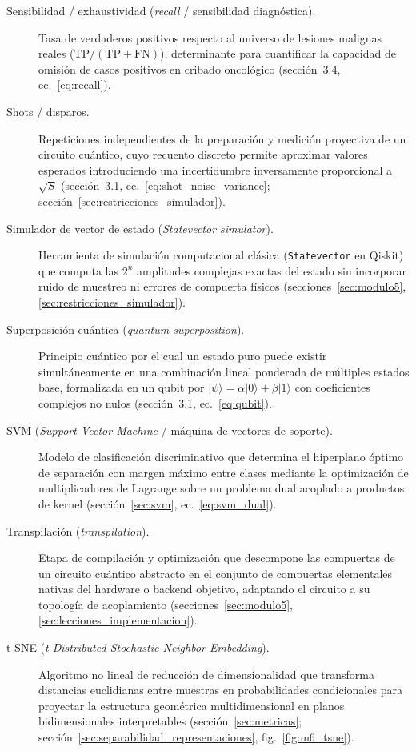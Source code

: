 \begin{description}
  \item[Sensibilidad / exhaustividad (\textit{recall} / sensibilidad diagnóstica).] Tasa de verdaderos positivos respecto al universo de lesiones malignas reales ($\mathrm{TP} / (\mathrm{TP} + \mathrm{FN})$), determinante para cuantificar la capacidad de omisión de casos positivos en cribado oncológico (sección~3.4, ec.~\ref{eq:recall}).

  \item[Shots / disparos.] Repeticiones independientes de la preparación y medición proyectiva de un circuito cuántico, cuyo recuento discreto permite aproximar valores esperados introduciendo una incertidumbre inversamente proporcional a $\sqrt{S}$ (sección~3.1, ec.~\ref{eq:shot_noise_variance}; sección~\ref{sec:restricciones_simulador}).

  \item[Simulador de vector de estado (\textit{Statevector simulator}).] Herramienta de simulación computacional clásica (\texttt{Statevector} en Qiskit) que computa las $2^n$ amplitudes complejas exactas del estado sin incorporar ruido de muestreo ni errores de compuerta físicos (secciones~\ref{sec:modulo5}, \ref{sec:restricciones_simulador}).

  \item[Superposición cuántica (\textit{quantum superposition}).] Principio cuántico por el cual un estado puro puede existir simultáneamente en una combinación lineal ponderada de múltiples estados base, formalizada en un qubit por $|\psi\rangle = \alpha|0\rangle + \beta|1\rangle$ con coeficientes complejos no nulos (sección~3.1, ec.~\ref{eq:qubit}).

  \item[SVM (\textit{Support Vector Machine} / máquina de vectores de soporte).] Modelo de clasificación discriminativo que determina el hiperplano óptimo de separación con margen máximo entre clases mediante la optimización de multiplicadores de Lagrange sobre un problema dual acoplado a productos de kernel (sección~\ref{sec:svm}, ec.~\ref{eq:svm_dual}).


  \item[Transpilación (\textit{transpilation}).] Etapa de compilación y optimización que descompone las compuertas de un circuito cuántico abstracto en el conjunto de compuertas elementales nativas del hardware o backend objetivo, adaptando el circuito a su topología de acoplamiento (secciones~\ref{sec:modulo5}, \ref{sec:lecciones_implementacion}).

  \item[t-SNE (\textit{t-Distributed Stochastic Neighbor Embedding}).] Algoritmo no lineal de reducción de dimensionalidad que transforma distancias euclidianas entre muestras en probabilidades condicionales para proyectar la estructura geométrica multidimensional en planos bidimensionales interpretables (sección~\ref{sec:metricas}; sección~\ref{sec:separabilidad_representaciones}, fig.~\ref{fig:m6_tsne}).


\end{description}
